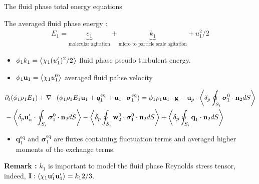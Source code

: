 \documentclass{sintefbeamer}
\begin{document}
\begin{frame}
  {The fluid phase total energy equations}

  The averaged fluid phase energy : 
  \begin{align}
    E_1 = 
    \underbrace{e_1 }_\text{molecular agitation}
    + \underbrace{k_1}_\text{micro to particle scale agitation}
    + u_1^2/2
    \label{eq:E_def}
\end{align}
\begin{itemize}
  \item $\phi_1 k_1 = \left<\chi_1 (u_1')^2/2\right>$ fluid phase pseudo turbulent energy. 
  \item $\phi_1 \textbf{u}_1 = \left<\chi_1 u_1^0\right>$ averaged fluid pahse velocity 
\end{itemize}

\begin{align*}
  &\partial_t (\phi_1\rho_1E_1)  
  + \mathbf{\nabla}\cdot (
      \phi_1\rho_1E_1\textbf{u}_1
      + \bm{q}_1^\text{eq}
      + \textbf{u}_1 \cdot \bm{\sigma}_1^\text{eq}
      )
  = 
  \phi_1 \rho_1\textbf{u}_1 \cdot \textbf{g} 
  - \textbf{u}_p \cdot \left<\delta_p \oint_{S_{i}} {\bm{\sigma}_1^0 \cdot \textbf{n}_2} dS\right>\nonumber \\
  &- \left<\delta_p  \textbf{u}_\alpha' \cdot \oint_{S_{i}}   \bm{\sigma}_1^0 \cdot \textbf{n}_2 dS\right>
  - \left<\delta_p  \oint_{S_{i}} \textbf{w}_2^0 \cdot \bm{\sigma}_1^0 \cdot \textbf{n}_2 dS\right>
  + \left<\delta_p \oint_{S_{i}} {\textbf{q}_1\cdot \textbf{n}_2} dS\right>
\end{align*}

\begin{itemize}
  \item $\bm{q}_1^\text{eq}$ and $\bm{\sigma}_1^\text{eq}$ are fluxes containing fluctuation terms and averaged higher moments of the exchange terms. 
\end{itemize}

\textbf{Remark :}
  $k_1$ is important to model the fluid phase Reynolds stress tensor, indeed, $\textbf{I} : \left<\chi_1 \textbf{u}_1'\textbf{u}_1'\right> = k_1 2/3$.

\end{frame}
\end{document}
